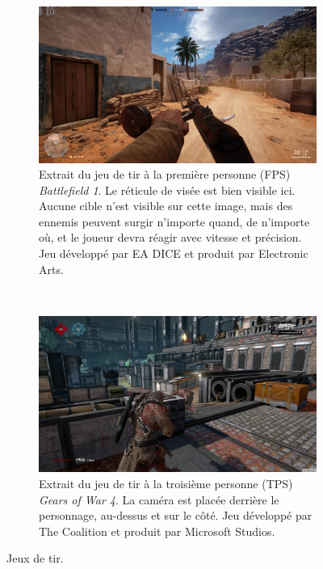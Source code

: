 	\begin{figure}[htb]
		\begin{subfigure}[t]{0.5\textwidth}
		\centering
		\includegraphics[width=\textwidth]{figures/ch1/bf1}
		\caption[Le FPS \emph{Battlefield 1}]{Extrait du jeu de tir à la première personne (FPS) \emph{Battlefield 1}. Le réticule de visée est bien visible ici. Aucune cible n'est visible sur cette image, mais des ennemis peuvent surgir n'importe quand, de n'importe où, et le joueur devra réagir avec vitesse et précision. Jeu développé par EA DICE et produit par Electronic Arts.}
		\label{fig:bf1}
		\end{subfigure}
		~
		\begin{subfigure}[t]{0.5\textwidth}
		\centering
		\includegraphics[width=\textwidth]{figures/ch1/gears}
		\caption[Le TPS \emph{Gears of War 4}]{Extrait du jeu de tir à la troisième personne (TPS) \emph{Gears of War 4}. La caméra est placée derrière le personnage, au-dessus et sur le côté. Jeu développé par The Coalition et produit par Microsoft Studios.}
		\label{fig:gears}
		\end{subfigure}
		\label{fig:shooters}
		\caption{Jeux de tir.}
	\end{figure}
	
